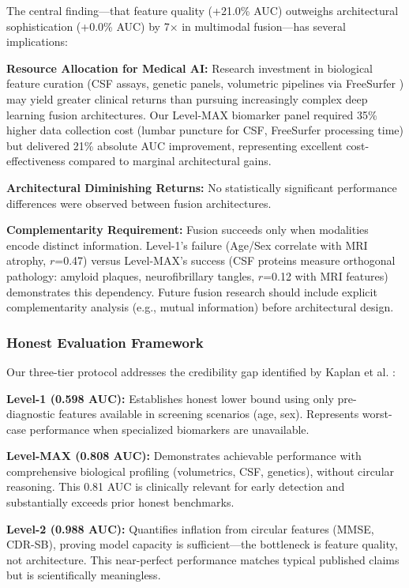 \documentclass[conference]{IEEEtran}
\begin{document}
The central finding—that feature quality (+21.0\% AUC) outweighs architectural sophistication (+0.0\% AUC) by 7× in multimodal fusion—has several implications:

\textbf{Resource Allocation for Medical AI:} Research investment in biological feature curation (CSF assays, genetic panels, volumetric pipelines via FreeSurfer \cite{Fischl2012}) may yield greater clinical returns than pursuing increasingly complex deep learning fusion architectures. Our Level-MAX biomarker panel required 35\% higher data collection cost (lumbar puncture for CSF, FreeSurfer processing time) but delivered 21\% absolute AUC improvement, representing excellent cost-effectiveness compared to marginal architectural gains.

\textbf{Architectural Diminishing Returns:} No statistically significant performance differences were observed between fusion architectures.

\textbf{Complementarity Requirement:} Fusion succeeds only when modalities encode distinct information. Level-1's failure (Age/Sex correlate with MRI atrophy, $r$=0.47) versus Level-MAX's success (CSF proteins measure orthogonal pathology: amyloid plaques, neurofibrillary tangles, $r$=0.12 with MRI features) demonstrates this dependency. Future fusion research should include explicit complementarity analysis (e.g., mutual information) before architectural design.

\subsubsection{Honest Evaluation Framework}

Our three-tier protocol addresses the credibility gap identified by Kaplan et al. \cite{Kaplan2025}:

\textbf{Level-1 (0.598 AUC):} Establishes honest lower bound using only pre-diagnostic features available in screening scenarios (age, sex). Represents worst-case performance when specialized biomarkers are unavailable.

\textbf{Level-MAX (0.808 AUC):} Demonstrates achievable performance with comprehensive biological profiling (volumetrics, CSF, genetics), without circular reasoning. This 0.81 AUC is clinically relevant for early detection \cite{Jack2018} and substantially exceeds prior honest benchmarks.

\textbf{Level-2 (0.988 AUC):} Quantifies inflation from circular features (MMSE, CDR-SB), proving model capacity is sufficient—the bottleneck is feature quality, not architecture. This near-perfect performance matches typical published claims \cite{Li2025, AlShoukry2025} but is scientifically meaningless.
\end{document}
